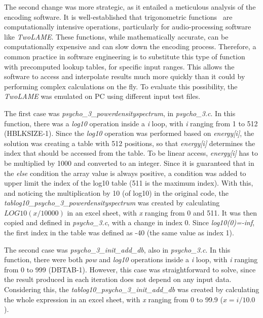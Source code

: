 The second change was more strategic, as it entailed a meticulous analysis of the encoding software. It is well-established that trigonometric functions~\cite{trigonometric} are computationally intensive operations, particularly for audio-processing software like \textit{TwoLAME}. These functions, while mathematically accurate, can be computationally expensive and can slow down the encoding process. Therefore, a common practice in software engineering is to substitute this type of function with precomputed lookup tables, for specific input ranges. This allows the software to access and interpolate results much more quickly than it could by performing complex calculations on the fly. 
To evaluate this possibility, the \textit{TwoLAME} was emulated on PC using different input test files.

The first case was \textit{psycho\_3\_powerdensityspectrum}, in \textit{psycho\_3.c}. In this function, there was a \textit{log10} operation inside a \textit{i} loop, with \textit{i} ranging from 1 to 512 (HBLKSIZE-1). Since the \textit{log10} operation was performed based on \textit{energy[i]}, the solution was creating a table with 512 positions, so that \textit{energy[i]} determines the index that should be accessed from the table. To be linear access, \textit{energy[i]} has to be multiplied by 1000 and converted to an integer. Since it is guaranteed that in the \textit{else} condition the array value is always positive, a condition was added to upper limit the index of the log10 table (511 is the maximum index). With this, and noticing the multiplication by 10 (of log10) in the original code, the \textit{tablog10\_psycho\_3\_powerdensityspectrum} was created by calculating $LOG10(x/10000)$ in an excel sheet, with \textit{x} ranging from 0 and 511. It was then copied and defined in \textit{psycho\_3.c}, with a change in index 0. Since \textit{log10(0)=-inf}, the first index in the table was defined as -40 (the same value as index 1).

\begin{comment}
\begin{figure}[H]
\centerline{\fbox{\texttt{[image: powerdensityspectrum.pdf]}}}
\caption{\textit{psycho\_3\_powerdensityspectrum} function.}
\label{powerdensityspectrum}
\end{figure}
\end{comment}


The second case was \textit{psycho\_3\_init\_add\_db}, also in \textit{psycho\_3.c}. In this function, there were both \textit{pow} and \textit{log10} operations inside a \textit{i} loop, with \textit{i} ranging from 0 to 999 (DBTAB-1). However, this case was straightforward to solve, since the result produced in each iteration does not depend on any input data. Considering this, the \textit{tablog10\_psycho\_3\_init\_add\_db} was created by calculating the whole expression in an excel sheet, with \textit{x} ranging from 0 to 99.9 ($x=i/10.0$).

